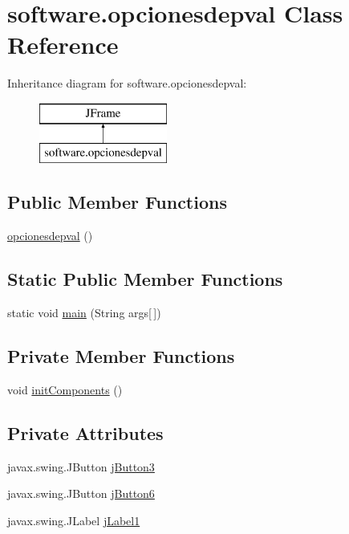\hypertarget{classsoftware_1_1opcionesdepval}{}\section{software.\+opcionesdepval Class Reference}
\label{classsoftware_1_1opcionesdepval}
Inheritance diagram for software.\+opcionesdepval\+:\begin{figure}[H]
\begin{center}
\leavevmode
\includegraphics[height=2.000000cm]{classsoftware_1_1opcionesdepval}
\end{center}
\end{figure}
\subsection*{Public Member Functions}
\begin{DoxyCompactItemize}
\item 
\mbox{\hyperlink{classsoftware_1_1opcionesdepval_aa861d1ccded1cb598792dc481db224c3}{opcionesdepval}} ()
\end{DoxyCompactItemize}
\subsection*{Static Public Member Functions}
\begin{DoxyCompactItemize}
\item 
static void \mbox{\hyperlink{classsoftware_1_1opcionesdepval_ab3891845a5410d47021b8647ad447688}{main}} (String args\mbox{[}$\,$\mbox{]})
\end{DoxyCompactItemize}
\subsection*{Private Member Functions}
\begin{DoxyCompactItemize}
\item 
void \mbox{\hyperlink{classsoftware_1_1opcionesdepval_a8d35dd2e1b7f1772acde05d06f031d69}{init\+Components}} ()
\end{DoxyCompactItemize}
\subsection*{Private Attributes}
\begin{DoxyCompactItemize}
\item 
javax.\+swing.\+J\+Button \mbox{\hyperlink{classsoftware_1_1opcionesdepval_a402a2f2b03d2cec3d84c627cb5c3e7e1}{j\+Button3}}
\item 
javax.\+swing.\+J\+Button \mbox{\hyperlink{classsoftware_1_1opcionesdepval_a97d4a64ac0d9874db69d6b48536e4f1b}{j\+Button6}}
\item 
javax.\+swing.\+J\+Label \mbox{\hyperlink{classsoftware_1_1opcionesdepval_ad50e625a5217f436e4271ad010531c99}{j\+Label1}}
\end{DoxyCompactItemize}


